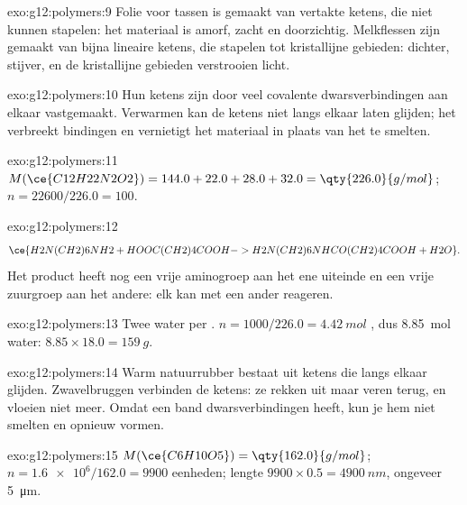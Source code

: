 \begin{solution}{exo:g12:polymers:9}
Folie voor tassen is gemaakt van vertakte ketens, die niet kunnen
stapelen: het materiaal is amorf, zacht en doorzichtig. Melkflessen zijn
gemaakt van bijna lineaire ketens, die stapelen tot kristallijne
gebieden: dichter, stijver, en de kristallijne gebieden verstrooien
licht.
\end{solution}

\begin{solution}{exo:g12:polymers:10}
Hun ketens zijn door veel covalente dwarsverbindingen aan elkaar
vastgemaakt. Verwarmen kan de ketens niet langs elkaar laten glijden; het
verbreekt bindingen en vernietigt het materiaal in plaats van het te
smelten.
\end{solution}

\begin{solution}{exo:g12:polymers:11}
$M(\ce{C12H22N2O2}) = 144.0 + 22.0 + 28.0 + 32.0 = \qty{226.0}{g/mol}$;
$n = 22600/226.0 = 100$.
\end{solution}

\begin{solution}{exo:g12:polymers:12}
\[
  \ce{H2N(CH2)6NH2 + HOOC(CH2)4COOH -> H2N(CH2)6NHCO(CH2)4COOH + H2O} .
\]
Het product heeft nog een vrije aminogroep aan het ene uiteinde en een
vrije zuurgroep aan het andere: elk kan met een ander  reageren.
\end{solution}

\begin{solution}{exo:g12:polymers:13}
Twee  water per . $n = 1000/226.0 =
\qty{4.42}{mol}$ , dus \qty{8.85}{mol} water:
$8.85 \times 18.0 = \qty{159}{g}$.
\end{solution}

\begin{solution}{exo:g12:polymers:14}
Warm natuurrubber bestaat uit ketens die langs elkaar glijden.
Zwavelbruggen verbinden de ketens: ze rekken uit maar veren terug, en
vloeien niet meer. Omdat een band dwarsverbindingen heeft, kun je hem niet
smelten en opnieuw vormen.
\end{solution}

\begin{solution}{exo:g12:polymers:15}
$M(\ce{C6H10O5}) = \qty{162.0}{g/mol}$; $n = \num{1.6e6}/162.0 = 9900$
eenheden; lengte $9900 \times 0.5 = \qty{4900}{nm}$, ongeveer
\qty{5}{\micro m}.
\end{solution}

